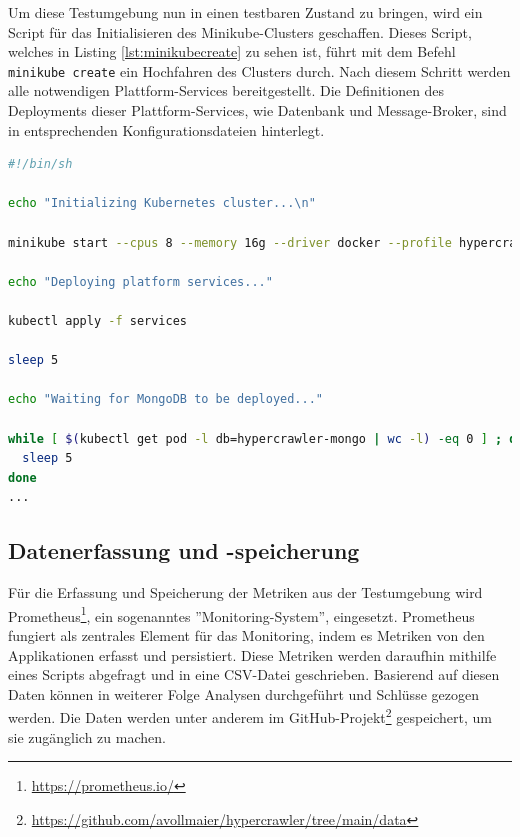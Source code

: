 Um diese Testumgebung nun in einen testbaren Zustand zu bringen, wird ein Script für das Initialisieren des Minikube-Clusters geschaffen. Dieses Script, welches in Listing \ref{lst:minikubecreate} zu sehen ist, führt mit dem Befehl \lstinline{minikube create} ein Hochfahren des Clusters durch. Nach diesem Schritt werden alle notwendigen Plattform-Services bereitgestellt. Die Definitionen des Deployments dieser Plattform-Services, wie Datenbank und Message-Broker, sind in entsprechenden Konfigurationsdateien hinterlegt.
\newline
\begin{lstlisting}[language=Bash, caption={Script zur Erstellung des Minikube Clusters und dem Deployment der Plattform-Services.},label={lst:minikubecreate}]
#!/bin/sh

echo "Initializing Kubernetes cluster...\n"

minikube start --cpus 8 --memory 16g --driver docker --profile hypercrawler --kubernetes-version=v1.28.3

echo "Deploying platform services..."

kubectl apply -f services

sleep 5

echo "Waiting for MongoDB to be deployed..."

while [ $(kubectl get pod -l db=hypercrawler-mongo | wc -l) -eq 0 ] ; do
  sleep 5
done
...
\end{lstlisting}

\subsection{Datenerfassung und -speicherung}
Für die Erfassung und Speicherung der Metriken aus der Testumgebung wird Prometheus\footnote{\url{https://prometheus.io/}}, ein sogenanntes ''Monitoring-System'', eingesetzt. Prometheus fungiert als zentrales Element für das Monitoring, indem es Metriken von den Applikationen erfasst und persistiert. Diese Metriken werden daraufhin mithilfe eines Scripts abgefragt und in eine CSV-Datei geschrieben. Basierend auf diesen Daten können in weiterer Folge Analysen durchgeführt und Schlüsse gezogen werden. Die Daten werden unter anderem im GitHub-Projekt\footnote{\url{https://github.com/avollmaier/hypercrawler/tree/main/data}} gespeichert, um sie zugänglich zu machen.

